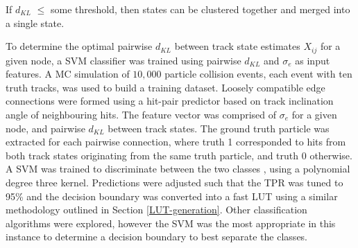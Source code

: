 If $d_{KL}$ $\leq$ some threshold, then states can be clustered together and merged into a single state.

To determine the optimal pairwise $d_{KL}$ between track state estimates $X_{ij}$ for a given node, a SVM classifier was trained using pairwise $d_{KL}$ and $\sigma_{e}$ as input features. A MC simulation of $10,000$ particle collision events, each event with ten truth tracks, was used to build a training dataset. Loosely compatible edge connections were formed using a hit-pair predictor based on track inclination angle of neighbouring hits. The feature vector was comprised of $\sigma_{e}$ for a given node, and pairwise $d_{KL}$ between track states. The ground truth particle was extracted for each pairwise connection, where truth 1 corresponded to hits from both track states originating from the same truth particle, and truth 0 otherwise. A SVM was trained to discriminate between the two classes \cite{scikit-learn}, using a polynomial degree three kernel. Predictions were adjusted such that the TPR was tuned to 95\% and the decision boundary was converted into a fast LUT using a similar methodology outlined in Section \ref{LUT-generation}.  Other classification algorithms were explored, however the SVM was the most appropriate in this instance to determine a decision boundary to best separate the classes.

